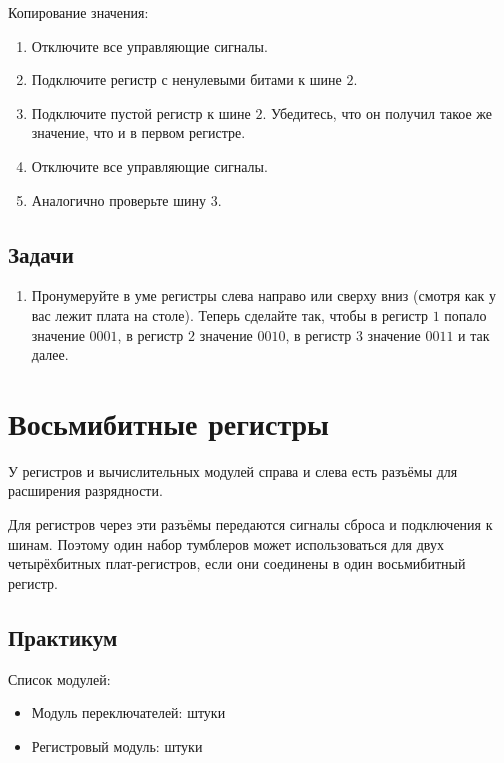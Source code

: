 Копирование значения:

\begin{enumerate}
    \item Отключите все управляющие сигналы.
    \item Подключите регистр с ненулевыми битами к шине $2$.
    \item Подключите пустой регистр к шине $2$. Убедитесь, что он получил такое же значение, что и в первом регистре.
    \item Отключите все управляющие сигналы.
    \item Аналогично проверьте шину $3$.
\end{enumerate}


\subsection{Задачи}

\begin{enumerate}
    \item Пронумеруйте в уме регистры слева направо или сверху вниз (смотря как у вас лежит плата на столе).
          Теперь сделайте так, чтобы в регистр $1$ попало значение $0001$, в регистр $2$ значение $0010$,
          в регистр $3$ значение $0011$ и так далее.
\end{enumerate}


\section{Восьмибитные регистры}

У регистров и вычислительных модулей справа и слева есть разъёмы для расширения разрядности.

Для регистров через эти разъёмы передаются сигналы сброса и подключения к шинам. Поэтому
один набор тумблеров может использоваться для двух четырёхбитных плат-регистров, если они
соединены в один восьмибитный регистр.

\subsection{Практикум}

Список модулей:
\begin{itemize}
    \item Модуль переключателей:  штуки
    \item Регистровый модуль:  штуки
\end{itemize}

